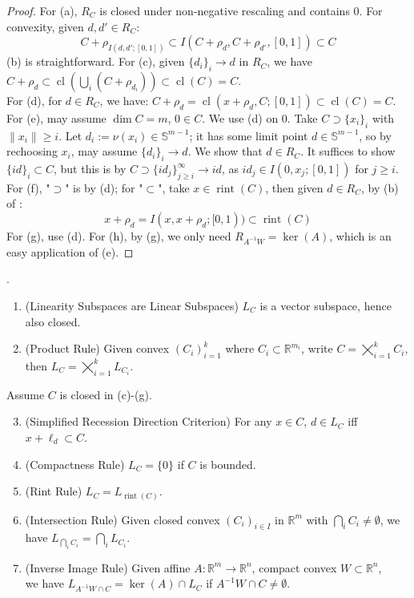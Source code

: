 \begin{proof}
	For (a), $R_C$ is closed under non-negative rescaling and contains $0$. For convexity, given $d,d'\in R_C$:
	\[
		C+\rho_{I(d,d';[0,1])}\subset I\left(C+\rho_{d},C+\rho_{d'},[0,1]\right)\subset C
	\]
	(b) is straightforward. For (c), given $\{d_i\}_i\to d$ in $R_C$, we have $C+\rho_d\subset \operatorname{cl}\left(\bigcup_i\left(C+\rho_{d_i}\right)\right)\subset \operatorname{cl}(C)=C$.\\
	For (d), for $d\in R_C$, we have: $C+\rho_d=\operatorname{cl}\left(x+\rho_d,C;[0,1]\right)\subset \operatorname{cl}(C)=C$.\\
	For (e), may assume $\dim C=m$, $0\in C$. We use (d) on $0$. Take $C\supset \{x_i\}_i$ with $\|x_i\|\geq i$. Let $d_i:=\nu(x_i)\in \mathbb{S}^{m-1}$; it has some limit point $d\in \mathbb{S}^{m-1}$, so by rechoosing $x_i$, may assume $\{d_i\}_i\to d$. We show that $d\in R_C$. It suffices to show $\{id\}_i\subset C$, but this is by $C\supset\{id_j\}_{j\geq i}^\infty\to id$, as $id_j\in I(0,x_j;[0,1])$ for $j\geq i$.\\
	For (f), "$\supset$" is by (d); for "$\subset$", take $x\in \operatorname{rint}(C)$, then given $d\in R_C$, by (b) of :
	\[
		x+\rho_d = I(x,x+\rho_d;[0, 1))\subset \operatorname{rint}(C)
	\]
	For (g), use (d). For (h), by (g), we only need $R_{A^{-1}W}=\operatorname{ker}(A)$, which is an easy application of (e).
\end{proof}

\begin{prop}.
	\label{prop:013-yoga-linearity}
	\begin{enumerate}[label=(\alph*)]
		\item (Linearity Subspaces are Linear Subspaces) $L_C$ is a vector subspace, hence also closed.
		\item (Product Rule) Given convex $(C_i)_{i=1}^k$ where $C_i\subset \mathbb{R}^{m_i}$, write $C=\bigtimes_{i=1}^kC_i$, then $L_C=\bigtimes_{i=1}^kL_{C_i}$.
	\end{enumerate}
	Assume $C$ is closed in (c)-(g).
	\begin{enumerate}[label=(\alph*)]
		\setcounter{enumi}{2}
		\item (Simplified Recession Direction Criterion) For any $x\in C$, $d\in L_C$ iff $x+\ell_d\subset C$.
		\item (Compactness Rule) $L_C=\{0\}$ if $C$ is bounded.
		\item (Rint Rule) $L_C=L_{\operatorname{rint}(C)}$.
		\item (Intersection Rule) Given closed convex $(C_i)_{i\in I}$ in $\mathbb{R}^m$ with $\bigcap_i{C_i}\neq\emptyset$, we have $L_{\bigcap_iC_i}=\bigcap_iL_{C_i}$.
		\item (Inverse Image Rule) Given affine $A:\mathbb{R}^m\to \mathbb{R}^n$, compact convex $W\subset \mathbb{R}^n$,\\we have $L_{A^{-1}W\cap C}=\operatorname{ker}(A)\cap L_C$ if $A^{-1}W\cap C\neq\emptyset$.
	\end{enumerate}
\end{prop}

